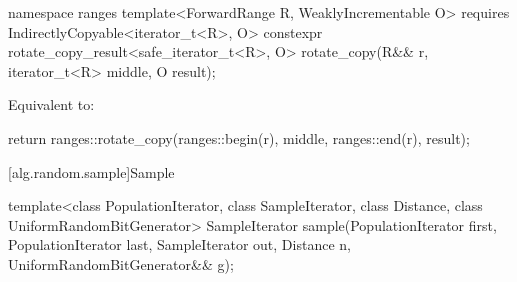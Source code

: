 \begin{itemdecl}
namespace ranges {
  template<ForwardRange R, WeaklyIncrementable O>
    requires IndirectlyCopyable<iterator_t<R>, O>
    constexpr rotate_copy_result<safe_iterator_t<R>, O>
      rotate_copy(R&& r, iterator_t<R> middle, O result);
}
\end{itemdecl}

\begin{itemdescr}
\pnum
\effects Equivalent to:
\begin{codeblock}
return ranges::rotate_copy(ranges::begin(r), middle, ranges::end(r), result);
\end{codeblock}
\end{itemdescr}

[alg.random.sample]{Sample}

%
\begin{itemdecl}
template<class PopulationIterator, class SampleIterator,
         class Distance, class UniformRandomBitGenerator>
  SampleIterator sample(PopulationIterator first, PopulationIterator last,
                        SampleIterator out, Distance n,
                        UniformRandomBitGenerator&& g);
\end{itemdecl}

